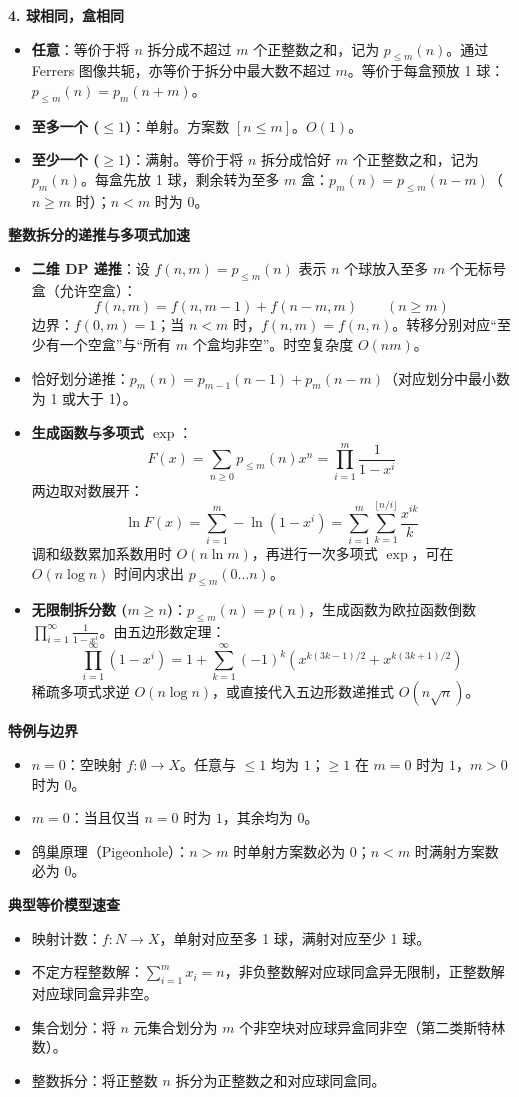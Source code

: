 \textbf{4. 球相同，盒相同}
\begin{itemize}
	\item \textbf{任意}：等价于将 $n$ 拆分成不超过 $m$ 个正整数之和，记为 $p_{\le m}(n)$。通过 Ferrers 图像共轭，亦等价于拆分中最大数不超过 $m$。等价于每盒预放 1 球：$p_{\le m}(n) = p_m(n+m)$。
	\item \textbf{至多一个 ($\le 1$)}：单射。方案数 $[n \le m]$。$O(1)$。
	\item \textbf{至少一个 ($\ge 1$)}：满射。等价于将 $n$ 拆分成恰好 $m$ 个正整数之和，记为 $p_m(n)$。每盒先放 1 球，剩余转为至多 $m$ 盒：$p_m(n) = p_{\le m}(n-m)$（$n \ge m$ 时）；$n < m$ 时为 $0$。
\end{itemize}

\textbf{整数拆分的递推与多项式加速}
\begin{itemize}
	\item \textbf{二维 DP 递推}：设 $f(n, m) = p_{\le m}(n)$ 表示 $n$ 个球放入至多 $m$ 个无标号盒（允许空盒）：
	\[
	f(n, m) = f(n, m-1) + f(n-m, m) \qquad (n \ge m)
	\]
	边界：$f(0, m) = 1$；当 $n < m$ 时，$f(n, m) = f(n, n)$。转移分别对应“至少有一个空盒”与“所有 $m$ 个盒均非空”。时空复杂度 $O(nm)$。
	\item 恰好划分递推：$p_m(n) = p_{m-1}(n-1) + p_m(n-m)$（对应划分中最小数为 1 或大于 1）。
	\item \textbf{生成函数与多项式 $\exp$}：
	\[
	F(x) = \sum_{n \ge 0} p_{\le m}(n) x^n = \prod_{i=1}^m \frac{1}{1-x^i}
	\]
	两边取对数展开：
	\[
	\ln F(x) = \sum_{i=1}^m -\ln(1-x^i) = \sum_{i=1}^m \sum_{k=1}^{\lfloor n/i \rfloor} \frac{x^{ik}}{k}
	\]
	调和级数累加系数用时 $O(n \ln m)$，再进行一次多项式 $\exp$，可在 $O(n \log n)$ 时间内求出 $p_{\le m}(0 \dots n)$。
	\item \textbf{无限制拆分数 ($m \ge n$)}：$p_{\le m}(n) = p(n)$，生成函数为欧拉函数倒数 $\prod_{i=1}^\infty \frac{1}{1-x^i}$。由五边形数定理：
	\[
	\prod_{i=1}^\infty (1-x^i) = 1 + \sum_{k=1}^\infty (-1)^k \left(x^{k(3k-1)/2} + x^{k(3k+1)/2}\right)
	\]
	稀疏多项式求逆 $O(n \log n)$，或直接代入五边形数递推式 $O(n\sqrt{n})$。
\end{itemize}

\textbf{特例与边界}
\begin{itemize}
	\item $n = 0$：空映射 $f: \emptyset \to X$。任意与 $\le 1$ 均为 $1$；$\ge 1$ 在 $m=0$ 时为 $1$，$m>0$ 时为 $0$。
	\item $m = 0$：当且仅当 $n = 0$ 时为 $1$，其余均为 $0$。
	\item 鸽巢原理（Pigeonhole）：$n > m$ 时单射方案数必为 $0$；$n < m$ 时满射方案数必为 $0$。
\end{itemize}

\textbf{典型等价模型速查}
\begin{itemize}
	\item 映射计数：$f: N \to X$，单射对应至多 1 球，满射对应至少 1 球。
	\item 不定方程整数解：$\sum_{i=1}^m x_i = n$，非负整数解对应球同盒异无限制，正整数解对应球同盒异非空。
	\item 集合划分：将 $n$ 元集合划分为 $m$ 个非空块对应球异盒同非空（第二类斯特林数）。
	\item 整数拆分：将正整数 $n$ 拆分为正整数之和对应球同盒同。
\end{itemize}
